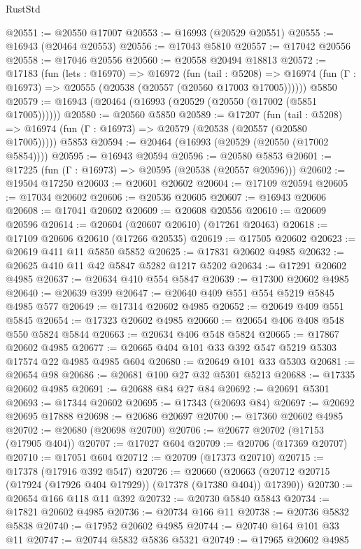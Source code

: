 \begin{lexlean}{RustStd}
\begin{coremodule}
@20551 := @20550 @17007
@20553 := @16993 (@20529 @20551)
@20555 := @16943 (@20464 @20553)
@20556 := @17043 @5810
@20557 := @17042 @20556
@20558 := @17046 @20556
@20560 := @20558 @20494 @18813
@20572 := @17183
    (fun (lets : @16970) =>
    @16972
      (fun (tail : @5208) =>
      @16974 (fun (Γ : @16973) => @20555 (@20538 (@20557 (@20560 @17003 @17005))))))
    @5850
@20579 := @16943 (@20464 (@16993 (@20529 (@20550 (@17002 (@5851 @17005))))))
@20580 := @20560 @5850
@20589 := @17207
    (fun (tail : @5208) => @16974 (fun (Γ : @16973) => @20579 (@20538 (@20557 (@20580 @17005)))))
    @5853
@20594 := @20464 (@16993 (@20529 (@20550 (@17002 @5854))))
@20595 := @16943 @20594
@20596 := @20580 @5853
@20601 := @17225 (fun (Γ : @16973) => @20595 (@20538 (@20557 @20596)))
@20602 := @19504 @17250
@20603 := @20601 @20602
@20604 := @17109 @20594
@20605 := @17034 @20602
@20606 := @20536 @20605
@20607 := @16943 @20606
@20608 := @17041 @20602
@20609 := @20608 @20556
@20610 := @20609 @20596
@20614 := @20604 (@20607 @20610) (@17261 @20463)
@20618 := @17109 @20606 @20610 (@17266 @20535)
@20619 := @17505 @20602
@20623 := @20619 @411 @11 @5850 @5852
@20625 := @17831 @20602 @4985
@20632 := @20625 @410 @11 @42 @5847 @5282 @1217 @5202
@20634 := @17291 @20602 @4985
@20637 := @20634 @410 @554 @5847
@20639 := @17300 @20602 @4985
@20640 := @20639 @399
@20647 := @20640 @409 @551 @554 @5219 @5845 @4985 @577
@20649 := @17314 @20602 @4985
@20652 := @20649 @409 @551 @5845
@20654 := @17323 @20602 @4985
@20660 := @20654 @406 @408 @548 @550 @5824 @5844
@20663 := @20634 @406 @548 @5824
@20665 := @17867 @20602 @4985
@20677 := @20665 @404 @101 @33 @392 @547 @5219 @5303 @17574 @22 @4985 @4985 @604
@20680 := @20649 @101 @33 @5303
@20681 := @20654 @98
@20686 := @20681 @100 @27 @32 @5301 @5213
@20688 := @17335 @20602 @4985
@20691 := @20688 @84 @27 @84
@20692 := @20691 @5301
@20693 := @17344 @20602
@20695 := @17343 (@20693 @84)
@20697 := @20692 @20695 @17888
@20698 := @20686 @20697
@20700 := @17360 @20602 @4985
@20702 := @20680 (@20698 @20700)
@20706 := @20677 @20702 (@17153 (@17905 @404))
@20707 := @17027 @604
@20709 := @20706 (@17369 @20707)
@20710 := @17051 @604
@20712 := @20709 (@17373 @20710)
@20715 := @17378 (@17916 @392 @547)
@20726 := @20660
    (@20663 (@20712 @20715 (@17924 (@17926 @404 @17929)) (@17378 (@17380 @404)) @17390))
@20730 := @20654 @166 @118 @11 @392
@20732 := @20730 @5840 @5843
@20734 := @17821 @20602 @4985
@20736 := @20734 @166 @11
@20738 := @20736 @5832 @5838
@20740 := @17952 @20602 @4985
@20744 := @20740 @164 @101 @33 @11
@20747 := @20744 @5832 @5836 @5321
@20749 := @17965 @20602 @4985

\end{coremodule}
\end{lexlean}
